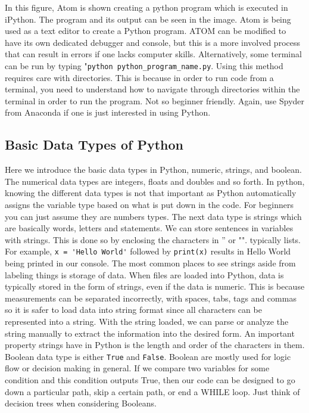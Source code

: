\documentclass[11pt,a4paper]{book}
\begin{document}
			In this figure, Atom is shown creating a python program which is executed in iPython. The program and its output can be seen in the image. Atom is being used as a text editor to create a Python program. ATOM can be modified to have its own dedicated debugger and console, but this is a more involved process that can result in errors if one lacks computer skills. Alternatively, some terminal can be run by typing "\lstinline|python python_program_name.py|. Using this method requires care with directories. This is because in order to run code from a terminal, you need to understand how to navigate through directories within the terminal in order to run the program. Not so beginner friendly. Again, use Spyder from Anaconda if one is just interested in using Python.
		
		\subsection{Basic Data Types of Python}
			\label{subsec:Basic Data Types of Python}
			Here we introduce the basic data types in Python, numeric, strings, and boolean. The numerical data types are integers, floats and doubles and so forth. In python, knowing the different data types is not that important as Python automatically assigns the variable type based on what is put down in the code. For beginners you can just assume they are numbers types. The next data type is strings which are basically words, letters and statements. We can store sentences in variables with strings. This is done so by enclosing the characters in '' or "".  typically lists. For example, \lstinline{x = 'Hello World'} followed by \lstinline|print(x)| results in Hello World being printed in our console. The most common places to see strings aside from labeling things is storage of data. When files are loaded into Python, data is typically stored in the form of strings, even if the data is numeric. This is because measurements can be separated incorrectly, with spaces, tabs, tags and commas so it is safer to load data into string format since all characters can be represented into a string. With the string loaded, we can parse or analyze the string manually to extract the information into the desired form. An important property strings have in Python is the length and order of the characters in them. Boolean data type is either \lstinline|True| and \lstinline|False|. Boolean are mostly used for logic flow or decision making in general. If we compare two variables for some condition and this condition outputs True, then our code can be designed to go down a particular path, skip a certain path, or end a WHILE loop. Just think of decision trees when considering Booleans.
			
\end{document}
